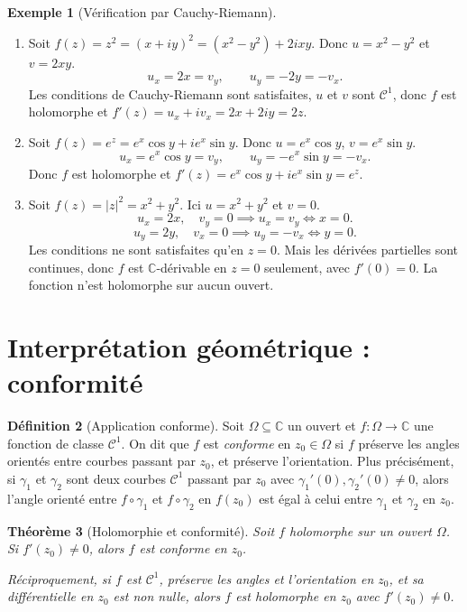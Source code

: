 \documentclass[12pt,a4paper,openany]{book}
\theoremstyle{definition}
\newtheorem{definition}{Définition}[chapter]
\newtheorem{exemple}[definition]{Exemple}
\theoremstyle{plain}
\newtheorem{theoreme}[definition]{Théorème}
\theoremstyle{remark}
\newcommand{\C}{\mathbb{C}}
\newcommand{\abs}[1]{\left|#1\right|}
\begin{document}
\begin{exemple}[Vérification par Cauchy-Riemann]\label{ex:CR-verification}
\begin{enumerate}[label=(\roman*)]
  \item Soit $f(z) = z^2 = (x+iy)^2 = (x^2-y^2) + 2ixy$. Donc $u = x^2 - y^2$ et $v = 2xy$.
  \[
    u_x = 2x = v_y, \qquad u_y = -2y = -v_x.
  \]
  Les conditions de Cauchy-Riemann sont satisfaites, $u$ et $v$ sont $\mathscr{C}^1$, donc $f$ est holomorphe et $f'(z) = u_x + iv_x = 2x + 2iy = 2z$.

  \item Soit $f(z) = e^z = e^x\cos y + ie^x\sin y$. Donc $u = e^x\cos y$, $v = e^x\sin y$.
  \[
    u_x = e^x\cos y = v_y, \qquad u_y = -e^x\sin y = -v_x.
  \]
  Donc $f$ est holomorphe et $f'(z) = e^x\cos y + ie^x\sin y = e^z$.

  \item Soit $f(z) = \abs{z}^2 = x^2 + y^2$. Ici $u = x^2+y^2$ et $v = 0$.
  \[
    u_x = 2x, \quad v_y = 0 \implies u_x = v_y \iff x = 0.
  \]
  \[
    u_y = 2y, \quad v_x = 0 \implies u_y = -v_x \iff y = 0.
  \]
  Les conditions ne sont satisfaites qu'en $z = 0$. Mais les dérivées partielles sont continues, donc $f$ est $\C$-dérivable en $z = 0$ seulement, avec $f'(0) = 0$. La fonction n'est holomorphe sur aucun ouvert.
\end{enumerate}
\end{exemple}

\section{Interprétation géométrique : conformité}\label{sec:conformite}

\begin{definition}[Application conforme]\label{def:conforme}
Soit $\Omega \subseteq \C$ un ouvert et $f : \Omega \to \C$ une fonction de classe $\mathscr{C}^1$. On dit que $f$ est \emph{conforme} en $z_0 \in \Omega$ si $f$ préserve les angles orientés entre courbes passant par $z_0$, et préserve l'orientation. Plus précisément, si $\gamma_1$ et $\gamma_2$ sont deux courbes $\mathscr{C}^1$ passant par $z_0$ avec $\gamma_1'(0), \gamma_2'(0) \neq 0$, alors l'angle orienté entre $f \circ \gamma_1$ et $f \circ \gamma_2$ en $f(z_0)$ est égal à celui entre $\gamma_1$ et $\gamma_2$ en $z_0$.
\end{definition}

\begin{theoreme}[Holomorphie et conformité]\label{thm:holomorphe-conforme}
Soit $f$ holomorphe sur un ouvert $\Omega$. Si $f'(z_0) \neq 0$, alors $f$ est conforme en $z_0$.

Réciproquement, si $f$ est $\mathscr{C}^1$, préserve les angles et l'orientation en $z_0$, et sa différentielle en $z_0$ est non nulle, alors $f$ est holomorphe en $z_0$ avec $f'(z_0) \neq 0$.
\end{theoreme}
\end{document}
